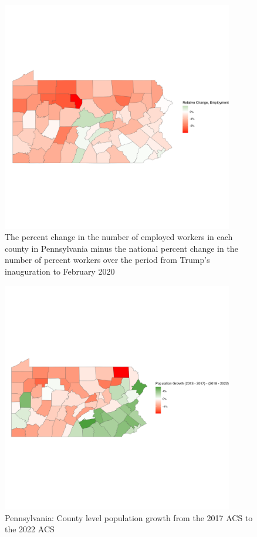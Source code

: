 \documentclass[11pt]{article}
\begin{document}
\begin{figure}
    \centering
    \includegraphics[width=0.9\textwidth]{plots/relative-employment-plot-pa.png}
    \caption{The percent change in the number of employed workers in each county in Pennsylvania minus the national percent change in the number of percent workers over the period from Trump's inauguration to February 2020}
\end{figure}
\begin{figure}
    \centering
    \includegraphics[width=0.9\textwidth]{plots/pa-growth.png}
    \caption{Pennsylvania: County level population growth from the 2017 ACS to the 2022 ACS}
\end{figure}
\end{document}
